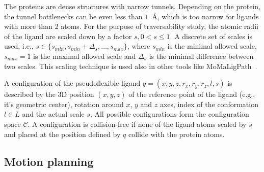 \documentclass{svmult}
\def\C{\mathcal{C}}
\def\CFD{{\mathcal{C}^s_{free}}}
\def\smin{s_{min}}
\def\smax{s_{max}}
\def\sdelta{{\Delta}_s}
\def\L{L}
\begin{document}

The proteins are dense structures with narrow tunnels.
Depending on the protein, the tunnel bottlenecks can be even less than $1$~\AA, which is too narrow for ligands with more than 2 atoms.
For the purpose of traversability study, the atomic radii of the ligand are scaled down by a factor $s, 0 < s \le 1$.
A discrete set of scales is used, i.e., $s \in \{\smin, \smin+\sdelta, \ldots, \smax\}$, where 
$\smin$ is the minimal allowed scale, $\smax=1$ is the maximal allowed scale and $\sdelta$ is the minimal difference between two scales.
This scaling technique is used also in other tools like MoMaLigPath~\cite{cortes2005path}.

A configuration of the pseudoflexible ligand $q=(x,y,z,r_x,r_y,r_z,l,s)$  is described
by the 3D position $(x,y,z)$ of the reference point of the ligand (e.g., it's geometric center), rotation around $x$, $y$ and $z$ axes,
index of the conformation $l\in \L$ and the actual scale $s$.
All possible configurations form the configuration space $\C$. 
A configuration is collision-free if none of the ligand atoms scaled by $s$ and placed at the
position defined by $q$ collide with the protein atoms.

\subsection{Motion planning}

\end{document}
